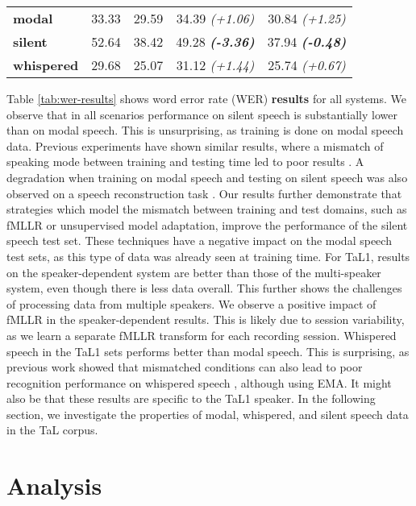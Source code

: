 \documentclass[a4paper]{article}
\begin{document}
\begin{table}[t]
{\begin{tabular}{@{}lcc|cc@{}}
\textbf{modal}                    & 33.33   & 29.59                       & 34.39 \enspace \textit{(+1.06)}       & 30.84 \enspace \textit{(+1.25)}     \\
\textbf{silent}                   & 52.64   & 38.42                       & 49.28 \enspace \textbf{\textit{(-3.36)}}       & 37.94 \enspace \textbf{\textit{(-0.48)}}      \\
\textbf{whispered}                & 29.68   & 25.07                       & 31.12 \enspace \textit{(+1.44)}       & 25.74 \enspace \textit{(+0.67)}      \\ 
\bottomrule
\end{tabular}%
}
\end{table}


Table \ref{tab:wer-results} shows word error rate (WER) \textbf{results} for all systems.
We observe that in all scenarios performance on silent speech is substantially lower than on modal speech.
This is unsurprising, as training is done on modal speech data.
Previous experiments have shown similar results, where a mismatch of speaking mode between training and testing time led to poor results \cite{florescu2010silent}.
A degradation when training on modal speech and testing on silent speech was also observed on a speech reconstruction task \cite{zhang2020tal}.
Our results further demonstrate that strategies which model the mismatch between training and test domains, such as fMLLR or unsupervised model adaptation, improve the performance of the silent speech test set.
These techniques have a negative impact on the modal speech test sets, as this type of data was already seen at training time.
For TaL1, results on the speaker-dependent system are better than those of the multi-speaker system, even though there is less data overall.
This further shows the challenges of processing data from multiple speakers.
We observe a positive impact of fMLLR in the speaker-dependent results.
This is likely due to session variability, as we learn a separate fMLLR transform for each recording session.
Whispered speech in the TaL1 sets performs better than modal speech.
This is surprising, as previous work showed that mismatched conditions can also lead to poor recognition performance on whispered speech \cite{srinivasan2019study}, although using EMA.
It might also be that these results are specific to the TaL1 speaker.
In the following section, we investigate the properties of modal, whispered, and silent speech data in the TaL corpus.

\section{Analysis}
\label{sec:analysis}
\end{document}
